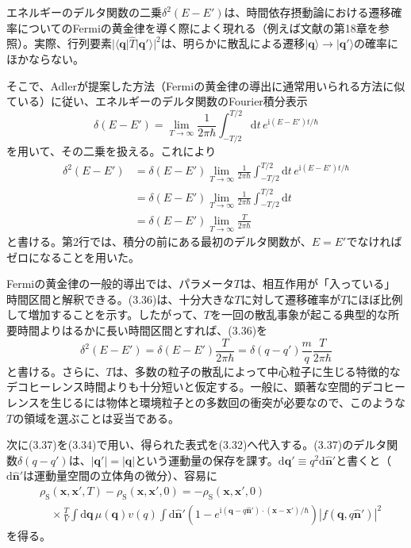 \hypertarget{srcpage:126}{}\label{srcpage:126}
エネルギーのデルタ関数の二乗$\delta^2(E-E')$は、時間依存摂動論における遷移確率についてのFermiの黄金律を導く際によく現れる（例えば文献\cite{ref167}の第18章を参照）。実際、行列要素$|\langle\bm q|\hat T|\bm q'\rangle|^2$は、明らかに散乱による遷移$|\bm q\rangle\longrightarrow|\bm q'\rangle$の確率にほかならない。

そこで、Adlerが提案した方法\cite{ref161}（Fermiの黄金律の導出に通常用いられる方法に似ている）に従い、エネルギーのデルタ関数のFourier積分表示
\begin{equation}
\delta(E-E')=\lim_{T\to\infty}\frac{1}{2\pi\hbar}\int_{-T/2}^{T/2}\mathrm dt\,e^{\mathrm i(E-E')t/\hbar}
\tag{3.35}
\end{equation}
を用いて、その二乗を扱える。これにより
\begin{equation}
\begin{aligned}
\delta^2(E-E')
&=\delta(E-E')\lim_{T\to\infty}\frac{1}{2\pi\hbar}\int_{-T/2}^{T/2}\mathrm dt\,e^{\mathrm i(E-E')t/\hbar}\\
&=\delta(E-E')\lim_{T\to\infty}\frac{1}{2\pi\hbar}\int_{-T/2}^{T/2}\mathrm dt\\
&=\delta(E-E')\lim_{T\to\infty}\frac{T}{2\pi\hbar}
\end{aligned}\tag{3.36}
\end{equation}
と書ける。第2行では、積分の前にある最初のデルタ関数が、$E=E'$でなければゼロになることを用いた。

Fermiの黄金律の一般的導出では、パラメータ$T$は、相互作用が「入っている」時間区間と解釈できる。(3.36)は、十分大きな$T$に対して遷移確率が$T$にほぼ比例して増加することを示す。したがって、$T$を一回の散乱事象が起こる典型的な所要時間よりはるかに長い時間区間とすれば、(3.36)を
\begin{equation}
\delta^2(E-E')=\delta(E-E')\frac{T}{2\pi\hbar}
=\delta(q-q')\frac{m}{q}\frac{T}{2\pi\hbar}
\tag{3.37}
\end{equation}
と書ける。さらに、$T$は、多数の粒子の散乱によって中心粒子に生じる特徴的なデコヒーレンス時間よりも十分短いと仮定する。一般に、顕著な空間的デコヒーレンスを生じるには物体と環境粒子との多数回の衝突が必要なので、このような$T$の領域を選ぶことは妥当である。

次に(3.37)を(3.34)で用い、得られた表式を(3.32)へ代入する。(3.37)のデルタ関数$\delta(q-q')$は、$|\bm q'|=|\bm q|$という運動量の保存を課す。$\mathrm d\bm q'\equiv q^2\mathrm d\hat{\bm n}'$と書くと（$\mathrm d\hat{\bm n}'$は運動量空間の立体角の微分）、容易に
\begin{equation}
\begin{aligned}
&\rho_{\mathrm S}(\bm x,\bm x',T)-\rho_{\mathrm S}(\bm x,\bm x',0)=-\rho_{\mathrm S}(\bm x,\bm x',0)\\
&\quad\times\frac{T}{V}\int\mathrm d\bm q\,\mu(\bm q)v(q)\int\mathrm d\hat{\bm n}'
\left(1-e^{\mathrm i(\bm q-q\hat{\bm n}')\cdot(\bm x-\bm x')/\hbar}\right)|f(\bm q,q\hat{\bm n}')|^2
\end{aligned}\tag{3.38}
\end{equation}
を得る。

